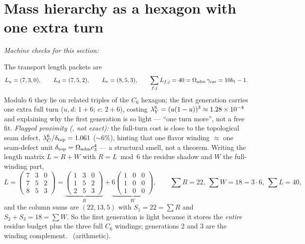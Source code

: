 \section{Mass hierarchy as a hexagon with one extra turn}
\noindent\emph{Machine checks for this section:}  


The transport length packets are
\begin{equation}
  L_u=(7,3,0),\qquad L_d=(7,5,2),\qquad L_e=(8,5,3),\qquad \sum_{f,j}L_{f,j}=40=\Omega_{\mathrm{adm}}\,\gamma_{\mathrm{car}}=10b_1-1 .
\end{equation}
Modulo $6$ they lie on related triples of the $C_6$ hexagon; the first generation carries one extra
full turn ($u,d:\,1+6$; $e:\,2+6$), costing $\lambda_Y^6=(u(1-u))^3\approx1.28\times10^{-4}$
and explaining why the first generation is so light --- ``one turn more'', not a free fit. \mC
\emph{Flagged proximity (\mO, not exact):} the full-turn cost is close to the topological seam defect,
$\lambda_C^6/\delta_{\mathrm{top}}=1.061$ ($\sim6\%$), hinting that one flavor winding $\approx$ one seam-defect unit
$\delta_{\mathrm{top}}=\Omega_{\mathrm{adm}}c_3^4$ --- a structural smell, not a theorem.
Writing the length matrix $L=R+W$ with $R=L\bmod6$ the residue shadow and $W$ the full-winding part,
\[
  L=\begin{pmatrix}7&3&0\\7&5&2\\8&5&3\end{pmatrix}=
  \underbrace{\begin{pmatrix}1&3&0\\1&5&2\\2&5&3\end{pmatrix}}_{R}+
  \underbrace{6\begin{pmatrix}1&0&0\\1&0&0\\1&0&0\end{pmatrix}}_{W},\qquad
  \sum R=22,\ \sum W=18=3\cdot6,\ \sum L=40,
\]
and the column sums are $(22,13,5)$ with $S_1=22=\sum R$ and $S_2+S_3=18=\sum W$. So the first
generation is light because it stores the \emph{entire} residue budget plus the three full $C_6$
windings; generations 2 and 3 are the winding complement. \mE\ (arithmetic).


